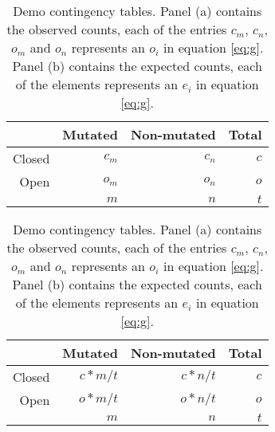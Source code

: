 \vspace{0.2cm}
\begin{table}[ht!]
    \caption{Demo contingency tables. Panel (a) contains the observed counts, each of the entries $c_m$, $c_n$, $o_m$ and $o_n$ represents an $o_i$ in equation \ref{eq:g}. Panel (b) contains the expected counts, each of the elements represents an $e_i$ in equation \ref{eq:g}.}
    \begin{subtable}[!h]{.5\textwidth}
        \centering
        \begin{tabular}{r|rr|r}
             & Mutated & Non-mutated & Total  \\
        \hline
            Closed & $c_m$ & $c_n$ & $c$ \\
            Open & $o_m$ & $o_n$ & $o$ \\
        \hline    
             & $m$ & $n$ & $t$ \\
        \end{tabular}
        \vspace{0.2cm}
    \label{tab:count_obs_demo}
    \end{subtable} 
    \quad %
    \begin{subtable}[!h]{.5\textwidth}
        \centering
        \begin{tabular}{r|rr|r}
             & Mutated & Non-mutated & Total  \\
        \hline     
            Closed & $c*m/t$ & $c*n/t$ & $c$ \\
            Open & $o*m/t$ & $o*n/t$ & $o$ \\
        \hline    
             & $m$ & $n$ & $t$ \\
        \end{tabular}
        \vspace{0.2cm}
    \label{tab:count_exp_demo}
    \end{subtable}    
\end{table}
